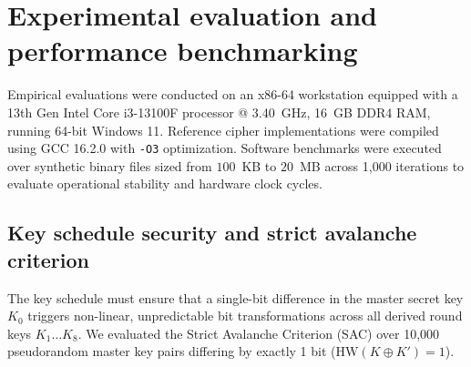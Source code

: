 \documentclass[10pt,twocolumn]{article}
\begin{document}
\section{Experimental evaluation and performance benchmarking}
\label{sec:experiments}

Empirical evaluations were conducted on an x86-64 workstation equipped with a 13th Gen Intel Core i3-13100F processor @ 3.40~GHz, 16~GB DDR4 RAM, running 64-bit Windows 11. Reference cipher implementations were compiled using GCC 16.2.0 with \texttt{-O3} optimization. Software benchmarks were executed over synthetic binary files sized from $100$~KB to $20$~MB across 1,000 iterations to evaluate operational stability and hardware clock cycles.

\subsection{Key schedule security and strict avalanche criterion}
\label{subsec:key_schedule_sac}
The key schedule must ensure that a single-bit difference in the master secret key $K_0$ triggers non-linear, unpredictable bit transformations across all derived round keys $K_1 \dots K_8$. We evaluated the Strict Avalanche Criterion (SAC) \cite{webster1985sac} over 10,000 pseudorandom master key pairs differing by exactly 1 bit ($\text{HW}(K \oplus K') = 1$). 

\begin{table}[htbp]
\caption{Strict avalanche criterion (SAC) of Rubik-4D key schedule across rounds (10,000 key pairs)}
\label{tab:key_schedule_sac}
\centering
\small
{}
\end{table}
\end{document}
